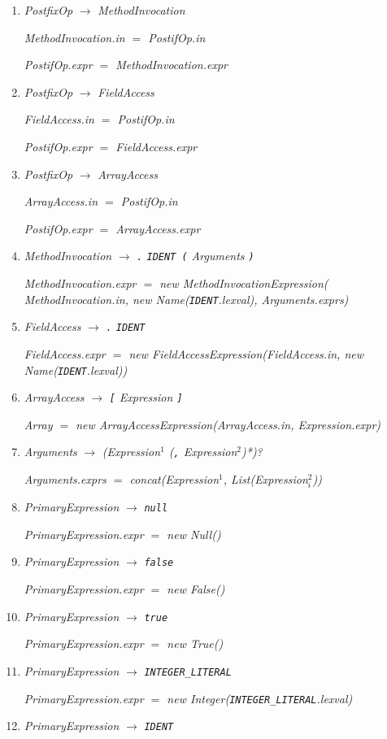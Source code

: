 \documentclass[12pt,a4paper]{scrartcl}
\renewcommand{\prod}[2]{\textit{#1} $\rightarrow$ \textit{#2}}
\newcommand{\tok}[1]{\textnormal{\texttt{#1}}}
\newcommand{\assign}[2]{\textit{#1} $=$ #2}
\newcommand{\List}[1]{\textnormal{List(\textit{#1})}}
\newcommand{\concat}[1]{\textnormal{concat(\textit{#1})}}
\newcommand{\new}[2]{\textnormal{new #1(\textit{#2})}}
\newcommand{\attr}[1]{\parbox{\linewidth}{\raggedleft \textit{#1}}}
\begin{document}
\begin{enumerate}
    \item \prod{PostfixOp}{MethodInvocation}\\
        \attr{\assign{MethodInvocation.in}{PostifOp.in}}
        \attr{\assign{PostifOp.expr}{MethodInvocation.expr}}
    \item \prod{PostfixOp}{FieldAccess}\\
        \attr{\assign{FieldAccess.in}{PostifOp.in}}
        \attr{\assign{PostifOp.expr}{FieldAccess.expr}}
    \item \prod{PostfixOp}{ArrayAccess}\\
        \attr{\assign{ArrayAccess.in}{PostifOp.in}}
        \attr{\assign{PostifOp.expr}{ArrayAccess.expr}}
    \item \prod{MethodInvocation}{\tok{.} \tok{IDENT (} Arguments \tok{)}}\\
        \attr{\assign{MethodInvocation.expr}{\new{MethodInvocationExpression}{\\MethodInvocation.in, \new{Name}{\tok{IDENT}.lexval}, Arguments.exprs}}}
    \item \prod{FieldAccess}{\tok{.} \tok{IDENT}}\\
        \attr{\assign{FieldAccess.expr}{\new{FieldAccessExpression}{FieldAccess.in, \new{Name}{\tok{IDENT}.lexval}}}}
    \item \prod{ArrayAccess}{\tok{[} Expression \tok{]}}\\
        \attr{\assign{Array}{\new{ArrayAccessExpression}{ArrayAccess.in, Expression.expr}}}
    \item \prod{Arguments}{(Expression$^1$ (\tok{,} Expression$^2$)*)?}\\
        \attr{\assign{Arguments.exprs}{\concat{Expression$^1$, \List{Expression$^2_i$}}}}
    \item \prod{PrimaryExpression}{\tok{null}}\\
        \attr{\assign{PrimaryExpression.expr}{\new{Null}{}}}
    \item \prod{PrimaryExpression}{\tok{false}}\\
        \attr{\assign{PrimaryExpression.expr}{\new{False}{}}}
    \item \prod{PrimaryExpression}{\tok{true}}\\
        \attr{\assign{PrimaryExpression.expr}{\new{True}{}}}
    \item \prod{PrimaryExpression}{\tok{INTEGER\_LITERAL}}\\
        \attr{\assign{PrimaryExpression.expr}{\new{Integer}{\tok{INTEGER\_LITERAL}.lexval}}}
    \item \prod{PrimaryExpression}{\tok{IDENT}}\\

\end{enumerate}
\end{document}
